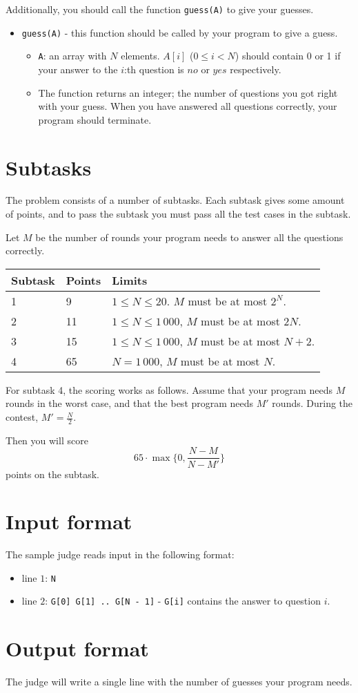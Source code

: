 Additionally, you should call the function \texttt{guess(A)} to give your guesses.
\begin{itemize}
  \item \texttt{guess(A)} - this function should be called by your program to give a guess.
    \begin{itemize}
      \item \texttt{A}: an array with $N$ elements. $A[i]$ ($0 \le i < N$) should contain 0 or 1 if your answer to the $i$:th question is $no$ or $yes$ respectively.
      \item The function returns an integer; the number of questions you got right with your guess. When you have answered all questions correctly, your program should terminate.
    \end{itemize}
\end{itemize}


\section*{Subtasks}
The problem consists of a number of subtasks. Each subtask gives some amount of points, and to pass
the subtask you must pass all the test cases in the subtask.

Let $M$ be the number of rounds your program needs to answer all the questions correctly.

\begin{tabular}{|l|l|l|}
  \hline
  \textbf{Subtask} & \textbf{Points} & \textbf{Limits} \\ \hline
  1 & 9 & $1 \le N \le 20$. $M$ must be at most $2^N$.  \\ \hline
  2 & 11 & $1 \le N \le 1\,000$, $M$ must be at most $2N$. \\ \hline
  3 & 15 & $1 \le N \le 1\,000$, $M$ must be at most $N + 2$. \\ \hline
  4 & 65 & $N = 1\,000$, $M$ must be at most $N$. \\ \hline
\end{tabular}

For subtask 4, the scoring works as follows. Assume that your program needs $M$ rounds in the worst case,
and that the best program needs $M'$ rounds. During the contest, $M' = \frac{N}{2}$.

Then you will score
\[ 65 \cdot \max \{ 0, \frac{N - M}{N - M'} \} \]
points on the subtask.

\section*{Input format}
The sample judge reads input in the following format:

\begin{itemize}
  \item line $1$: \texttt{N}
  \item line $2$: \texttt{G[0] G[1] .. G[N - 1]} - \texttt{G[i]} contains the answer to question $i$.
\end{itemize}

\section*{Output format}
The judge will write a single line with the number of guesses your program needs.
